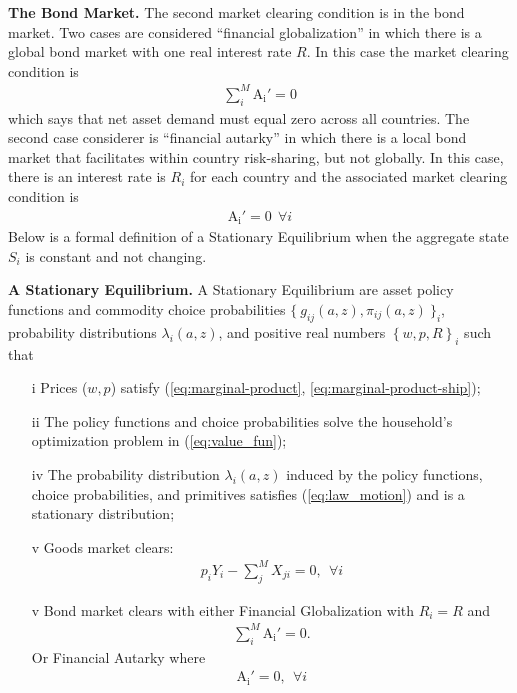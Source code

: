 \documentclass[12pt,pdftex]{article}
\begin{document}
\begin{onehalfspacing}
\textbf{The Bond Market.} The second market clearing condition is in the bond market. Two cases are considered ``financial globalization'' in which there is a global bond market with one real interest rate $R$. In this case the market clearing condition is
\begin{align}
\sum_{i}^{M} \mathrm{A_i'} = 0
\label{eq:bond-market-global}
\end{align}
which says that net asset demand must equal zero across all countries. The second case considerer is ``financial autarky'' in which there is a local bond market that facilitates within country risk-sharing, but not globally. In this case, there is an interest rate is $R_i$ for each country and the associated market clearing condition is
\begin{align}
\mathrm{A_i'} = 0 \ \ \forall i
\label{eq:bond-market-country}
\end{align}
Below is a formal definition of a Stationary Equilibrium when the aggregate state $S_i$ is constant and not changing.

\textbf{A Stationary Equilibrium.} A Stationary Equilibrium are asset policy functions and commodity choice probabilities $\{\  g_{ij}(a, z), \pi_{ij}(a, z) \ \}_{i}$, probability distributions $\lambda_i(a, z)$, and positive real numbers $\left \{w, p, R\right \}_{i}$ such that
\begin{itemize}
\vspace{-.4cm}
\item[i]  Prices ($w, p$) satisfy (\ref{eq:marginal-product}, \ref{eq:marginal-product-ship});
\item[ii] The policy functions and choice probabilities solve the household's optimization problem in (\ref{eq:value_fun});
\item[iv] The probability distribution $\lambda_i(a, z)$ induced by the policy functions, choice probabilities, and primitives satisfies (\ref{eq:law_motion}) and is a stationary distribution;
\item[v] Goods market clears:
\begin{align}
p_{i} Y_{i} - \sum_{j}^{M}  X_{ji} = 0, \ \ \forall i
\end{align}
\item[v] Bond market clears with either Financial Globalization with $R_i = R$ and
\begin{align}
\sum_{i}^{M} \mathrm{A_i'} = 0.
\label{eq:fg-condition}
\end{align}
Or Financial Autarky where
\begin{align}
\mathrm{A_i'} = 0, \ \ \forall i
\label{eq:fa-condition}
\end{align}
\end{itemize}


\end{onehalfspacing}
\end{document}
